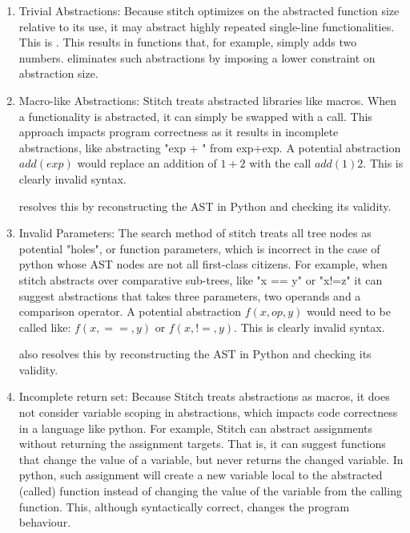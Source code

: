 \begin{enumerate}
    \item Trivial Abstractions:
    Because stitch optimizes on the abstracted function size relative to its use, it may abstract highly repeated single-line functionalities. This is . This results in functions that, for example, simply adds two numbers. \toolname eliminates such abstractions by imposing a lower constraint on abstraction size.
    \item Macro-like Abstractions: 
    Stitch treats abstracted libraries like macros. When a functionality is abstracted, it can simply be swapped with a call. This approach impacts program correctness as it results in incomplete abstractions, like abstracting "exp + " from exp+exp. A potential abstraction $add(exp)$ would replace an addition of $1+2$ with the call $add(1) 2$. This is clearly invalid syntax.
    
    \toolname resolves this by reconstructing the AST in Python and checking its validity. 
    \item Invalid Parameters:
    The search method of stitch treats all tree nodes as potential "holes", or function parameters, which is incorrect in the case of python whose AST nodes are not all first-class citizens. For example, when stitch abstracts over comparative sub-trees, like "x == y" or "x!=z" it can suggest abstractions that takes three parameters, two operands and a comparison operator. A potential abstraction $f(x,op,y)$ would need to be called like: $f(x, ==, y)$ or $f(x, !=, y)$. This is clearly invalid syntax.
    
    \toolname also resolves this by reconstructing the AST in Python and checking its validity. 
    \item Incomplete return set:
    Because Stitch treats abstractions as macros, it does not consider variable scoping in abstractions, which impacts code correctness in a language like python. For example, Stitch can abstract assignments without returning the assignment targets. That is, it can suggest functions that change the value of a variable, but never returns the changed variable. In python, such assignment will create a new variable local to the abstracted (called) function instead of changing the value of the variable from the calling function. This, although syntactically correct, changes the program behaviour. 


\end{enumerate}
